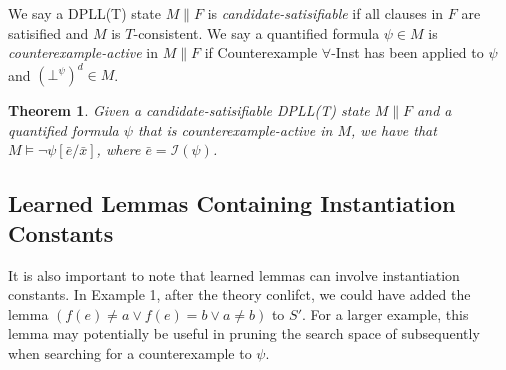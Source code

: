 \documentclass{llncs}
\newtheorem{thm}{Theorem}
\begin{document}
We say a DPLL(T) state $M \parallel F$ is \emph{candidate-satisifiable} if all clauses in $F$ are satisified and $M$ is $T$-consistent.
We say a quantified formula $\psi \in M$ is \emph{counterexample-active} in $M \parallel F$ if Counterexample $\forall$-Inst has been applied to $\psi$ and $(\bot^\psi)^d \in M$.

\begin{thm}
\label{thm:cerep}
Given a candidate-satisifiable DPLL(T) state $M \parallel F$ and a quantified formula $\psi$ that is counterexample-active in $M$, we have that $M \models \neg \psi[\bar{e}/\bar{x}]$, where $\bar{e} = \mathcal{I}( \psi )$.
\end{thm}

\subsection{Learned Lemmas Containing Instantiation Constants}

It is also important to note that learned lemmas can involve instantiation constants.
In Example 1, after the theory conlifct, we could have added the lemma $( f( e ) \neq a \vee f( e ) = b \vee a \neq b )$ to $S'$.
For a larger example, this lemma may potentially be useful in pruning the search space of subsequently when searching for a counterexample to $\psi$.

\begin{comment}
It is also important to note that learned lemmas can involve instantiation constants.
In this example, after the theory conlifct, we could have added the lemma $(\varphi_1 : ) ( f( e ) \neq a \vee f( e ) = b \vee a \neq b )$ to $S'$.
In this case, we may apply Decide to come to the state $( a = b ), \psi, (\neg \bot^\psi), (f( e ) \neq a)^d \parallel S' \cup \varphi$, where again all clauses are satisfied, and the solver answers SAT in the same manner.

However, note that the lemma $\varphi_1$ is only useful in contexts in which $\psi$ is asserted.
In other words, the solver should not be searching for values of counterexamples to quantified formulas $\psi$ when $\psi$ is not asserted.
We will see in Section~\ref{sec:implementation} a recommended implementation for which this concern is addressed.
[do this: do these lemmas pollute the DPLL(T) space?  When should we forget them?  Should we give them to minisat?]
[do this: examine elaborating lemmas involving instantiation constants as being lemmas involving universal statements, justify as well]
\end{comment}
\end{document}
